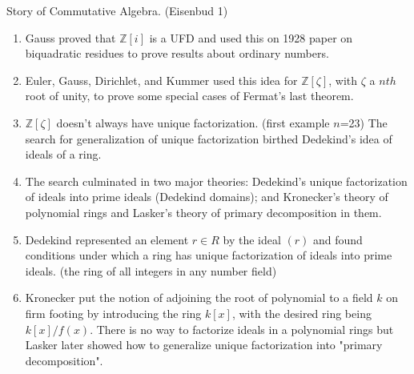 \begin{notes}
    Story of Commutative Algebra. (Eisenbud 1)
\end{notes}

\begin{enumerate}
    \item
          Gauss proved that $\mathbb{Z}[i]$ is a UFD and used this
          on 1928 paper on biquadratic residues to prove results about
          ordinary numbers.
    \item
          Euler, Gauss, Dirichlet, and Kummer used this idea for $\mathbb{Z}
              [\zeta]$, with $\zeta$ a $nth$ root of unity,
          to prove some special cases of Fermat's last theorem.
    \item
          $\mathbb{Z}[\zeta]$ doesn't always have unique factorization. (first example
          $n$=23) The search for generalization of unique factorization birthed Dedekind's
          idea of ideals of a ring.
    \item
          The search culminated in two major theories:
          Dedekind's unique factorization of ideals into prime ideals (Dedekind
          domains); and Kronecker's theory of polynomial rings and Lasker's theory
          of primary decomposition in them.
    \item
          Dedekind represented an element $r\in R$ by the ideal $(r)$ and found conditions
          under which a ring has unique factorization of ideals into prime ideals. (the ring
          of all integers in any number field)
    \item
          Kronecker put the notion of adjoining the root of polynomial to a field $k$ on firm footing
          by introducing the ring $k[x]$, with the desired ring being $k[x]/f(x)$. There is no way to
          factorize ideals in a polynomial rings but Lasker later showed how to generalize unique
          factorization into "primary decomposition".

\end{enumerate}